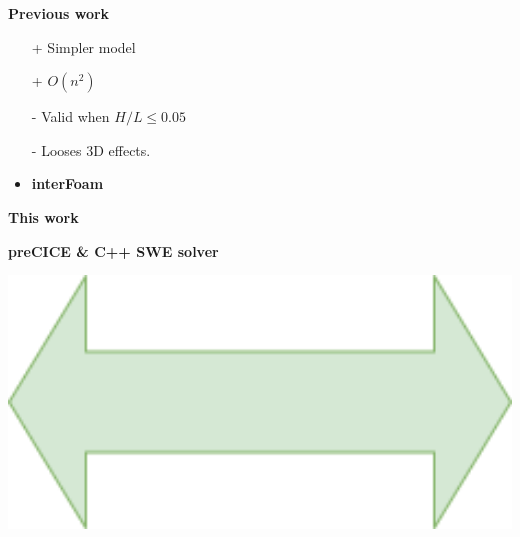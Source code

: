 \begin{frame}
{\Large \textbf{Previous work \cite{mintgen}}}\\[0.5cm]
\hspace{1cm}
\begin{minipage}{0.35\textwidth}
\begin{tcolorbox}[
colframe=TUMDarkestBlue,
colback=TUMDarkBlue!50,
title = \centering SWE\\2D] 
\begin{itemize}
\item[+] Simpler model 
\item[+] $O(n^2)$
\item[-] Valid when $H/L \leq 0.05$ %
\item[-] Looses 3D effects. \vspace{0.5cm}
\item \large \textbf{interFoam}
\end{itemize}
\end{tcolorbox}    
\vspace{1cm}
\hspace{-1cm}
{\Large \textbf{This work}}
\vspace{0.3cm}
\begin{tcolorbox}[
colframe=TUMDarkestBlue,
colback=TUMDarkBlue!50] 
{\large \textbf{preCICE \& C++ SWE solver}}
\end{tcolorbox}  
\end{minipage}
\begin{minipage}{0.15\textwidth}
\hspace{0.5cm}
\vspace{3.5cm}
\includegraphics[width=1\textwidth]{Resources/Images/arrow2.png}\\

\end{minipage}
\end{frame}
